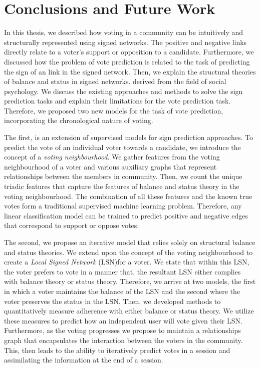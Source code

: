 \chapter{Conclusions and Future Work}
\label{chp:conclusion}
In this thesis, we described how voting in a community can be intuitively and structurally represented using signed networks.
The positive and negative links directly relate to a voter's support or opposition to a candidate.
Furthermore, we discussed how the problem of vote prediction is related to the task of predicting the sign of an link in the signed network.
Then, we explain the structural theories of balance and status in signed networks. derived from the field of social psychology.
We discuss the existing approaches and methods to solve the sign prediction tasks and explain their limitations for the vote prediction task.
Therefore, we proposed two new models for the task of vote prediction, incorporating the chronological nature of voting.

The first, is an extension of supervised models for sign prediction approaches.
To predict the vote of an individual voter towards a candidate, we introduce the concept of a \textit{voting neighbourhood}.
We gather features from the voting neighbourhood of a voter and various auxiliary graphs that represent relationships between the members in community.
Then, we count the unique triadic features that capture the features of balance and status theory in the voting neighbourhood.
The combination of all these features and the known true votes form a traditional supervised machine learning problem.
Therefore, any linear classification model can be trained to predict positive and negative edges that correspond to support or oppose votes.

The second, we propose an iterative model that relies solely on structural balance and status theories.
We extend upon the concept of the voting neighbourhood to create a \textit{Local Signed Network} (LSN)for a voter.
We state that within this LSN, the voter prefers to vote in a manner that, the resultant LSN either complies with balance theory or status theory.
Therefore, we arrive at two models, the first in which a voter maintains the balance of the LSN and the second where the voter preserves the status in the LSN.
Then, we developed methods to quantitatively measure adherence with either balance or status theory.
We utilize these measures to predict how an independent user will vote given their LSN.
Furthermore, as the voting progresses we propose to maintain a relationships graph that encapsulates the interaction between the voters in the community.
This, then leads to the ability to iteratively predict votes in a session and assimilating the information at the end of a session.

